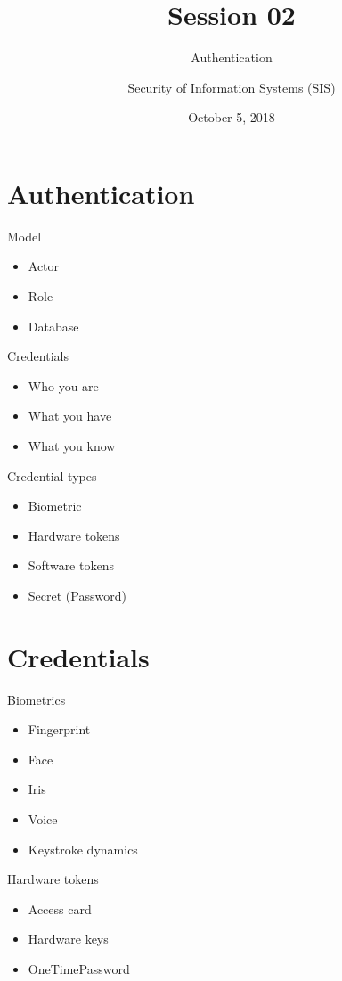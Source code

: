\documentclass{curs}
\title[Session 02]{Session 02}
\subtitle{Authentication}
\author{Security of Information Systems (SIS)}
\date{October 5, 2018}
\begin{document}
\frame{\titlepage}


\section{Authentication}

\begin{frame}{Model}
  \begin{itemize}
    \item Actor
    \item Role
    \item Database
  \end{itemize}
\end{frame}

\begin{frame}{Credentials}
  \begin{itemize}
    \item Who you are
    \item What you have
    \item What you know
  \end{itemize}
\end{frame}

\begin{frame}{Credential types}
  \begin{itemize}
    \item Biometric
    \item Hardware tokens
    \item Software tokens
    \item Secret (Password)
  \end{itemize}
\end{frame}


\section{Credentials}

\begin{frame}{Biometrics}
  \begin{itemize}
    \item Fingerprint
    \item Face
    \item Iris
    \item Voice
    \item Keystroke dynamics
  \end{itemize}
\end{frame}

\begin{frame}{Hardware tokens}
  \begin{itemize}
      \item Access card
      \item Hardware keys
      \item OneTimePassword
    \end{itemize}
\end{frame}
\end{document}
